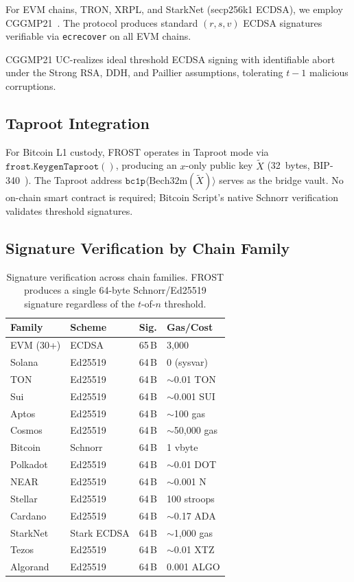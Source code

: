 For EVM chains, TRON, XRPL, and StarkNet (secp256k1 ECDSA), we employ CGGMP21~\cite{cggmp21}. The protocol produces standard $(r, s, v)$ ECDSA signatures verifiable via \texttt{ecrecover} on all EVM chains.

\begin{theorem}
CGGMP21 UC-realizes ideal threshold ECDSA signing with identifiable abort under the Strong RSA, DDH, and Paillier assumptions, tolerating $t - 1$ malicious corruptions.
\end{theorem}

\subsection{Taproot Integration}

For Bitcoin L1 custody, FROST operates in Taproot mode via $\texttt{frost.KeygenTaproot}()$, producing an $x$-only public key $\tilde{X}$ (32~bytes, BIP-340~\cite{bip340}). The Taproot address $\texttt{bc1p}\langle\text{Bech32m}(\tilde{X})\rangle$ serves as the bridge vault. No on-chain smart contract is required; Bitcoin Script's native Schnorr verification validates threshold signatures.

\subsection{Signature Verification by Chain Family}

\begin{table}[h]
\centering
\small
\begin{tabular}{llll}
\toprule
\textbf{Family} & \textbf{Scheme} & \textbf{Sig.} & \textbf{Gas/Cost} \\
\midrule
EVM (30+) & ECDSA & 65\,B & 3{,}000 \\
Solana & Ed25519 & 64\,B & 0 (sysvar) \\
TON & Ed25519 & 64\,B & $\sim$0.01 TON \\
Sui & Ed25519 & 64\,B & $\sim$0.001 SUI \\
Aptos & Ed25519 & 64\,B & $\sim$100 gas \\
Cosmos & Ed25519 & 64\,B & $\sim$50{,}000 gas \\
Bitcoin & Schnorr & 64\,B & 1 vbyte \\
Polkadot & Ed25519 & 64\,B & $\sim$0.01 DOT \\
NEAR & Ed25519 & 64\,B & $\sim$0.001 N \\
Stellar & Ed25519 & 64\,B & 100 stroops \\
Cardano & Ed25519 & 64\,B & $\sim$0.17 ADA \\
StarkNet & Stark ECDSA & 64\,B & $\sim$1{,}000 gas \\
Tezos & Ed25519 & 64\,B & $\sim$0.01 XTZ \\
Algorand & Ed25519 & 64\,B & 0.001 ALGO \\
\bottomrule
\end{tabular}
\caption{Signature verification across chain families. FROST produces a single 64-byte Schnorr/Ed25519 signature regardless of the $t$-of-$n$ threshold.}
\label{tab:sigverify}
\end{table}

